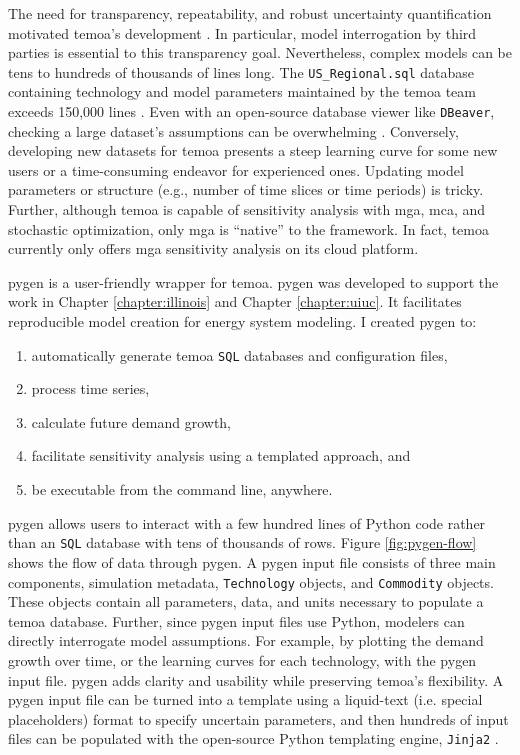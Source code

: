 The need for transparency, repeatability, and robust uncertainty quantification
motivated \gls{temoa}'s development \cite{hunter_modeling_2013}.
In particular, model interrogation by third parties is essential to this transparency
goal. Nevertheless, complex models can be tens to hundreds of thousands of lines long.
The \texttt{US\_Regional.sql} database containing technology and model parameters
maintained by the \gls{temoa} team exceeds
150,000 lines \cite{model_databases_2021}. Even with an open-source
database viewer like \texttt{DBeaver}, checking a large dataset's assumptions can be
overwhelming \cite{rider_dbeaver_nodate}. Conversely, developing new datasets
for \gls{temoa} presents a steep learning curve for some new users or a time-consuming
endeavor for experienced ones. Updating model parameters or structure (e.g., number
of time slices or time periods) is tricky. Further, although \gls{temoa}
is capable of sensitivity analysis with \gls{mga}, \gls{mca}, and stochastic
optimization, only \gls{mga} is ``native'' to the framework. In fact, \gls{temoa}
currently only offers \gls{mga} sensitivity analysis on its cloud platform.

\gls{pygen} is a user-friendly wrapper for \gls{temoa}. \gls{pygen} was developed
to support the work in Chapter \ref{chapter:illinois} and Chapter \ref{chapter:uiuc}.
It facilitates reproducible model creation for energy system modeling.
I created \gls{pygen} to:
\begin{enumerate}
  \item automatically generate \gls{temoa} \texttt{SQL} databases and configuration files,
  \item process time series,
  \item calculate future demand growth,
  \item facilitate sensitivity analysis using a templated approach, and
  \item be executable from the command line, anywhere.
\end{enumerate}
\gls{pygen} allows users to interact with a few hundred lines of Python code rather
than an \texttt{SQL} database with tens of thousands of rows.
Figure \ref{fig:pygen-flow} shows the flow of data through \gls{pygen}.
A \gls{pygen} input file consists of three main components, simulation metadata,
\texttt{Technology} objects, and \texttt{Commodity} objects. These objects
contain all parameters, data, and units necessary to populate a \gls{temoa}
database. Further, since \gls{pygen} input files use Python, modelers
can directly interrogate model assumptions. For example, by plotting the demand
growth over time, or the learning curves for each technology, with the \gls{pygen}
input file.
\gls{pygen} adds clarity and usability while preserving \gls{temoa}'s flexibility.
A \gls{pygen} input file can be turned into a template using a liquid-text (i.e.
special placeholders) format to specify uncertain parameters, and then hundreds
of input files can be populated with the open-source Python templating engine,
\texttt{Jinja2} \cite{ronacher_jinja_2022}.

